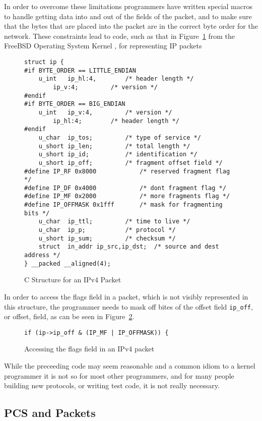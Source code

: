 \documentclass{sig-alternate-10pt}
\begin{document}
In order to overcome these limitations programmers have written
special macros to handle getting data into and out of the fields of
the packet, and to make sure that the bytes that are placed into the
packet are in the correct byte order for the network.  These
constraints lead to code, such as that in
Figure~\ref{fig:c-structure-for-an-ipv4-packet} from the FreeBSD
Operating System Kernel \cite{McKusick}, for representing IP packets

\begin{figure}
  \centering
\begin{verbatim}
struct ip {
#if BYTE_ORDER == LITTLE_ENDIAN
	u_int	ip_hl:4,		/* header length */
		ip_v:4;			/* version */
#endif
#if BYTE_ORDER == BIG_ENDIAN
	u_int	ip_v:4,			/* version */
		ip_hl:4;		/* header length */
#endif
	u_char	ip_tos;			/* type of service */
	u_short	ip_len;			/* total length */
	u_short	ip_id;			/* identification */
	u_short	ip_off;			/* fragment offset field */
#define	IP_RF 0x8000			/* reserved fragment flag */
#define	IP_DF 0x4000			/* dont fragment flag */
#define	IP_MF 0x2000			/* more fragments flag */
#define	IP_OFFMASK 0x1fff		/* mask for fragmenting bits */
	u_char	ip_ttl;			/* time to live */
	u_char	ip_p;			/* protocol */
	u_short	ip_sum;			/* checksum */
	struct	in_addr ip_src,ip_dst;	/* source and dest address */
} __packed __aligned(4);
\end{verbatim}
  \caption{C Structure for an IPv4 Packet}
  \label{fig:c-structure-for-an-ipv4-packet}
\end{figure}

In order to access the flags field in a packet, which is not visibly
represented in this structure, the programmer needs to mask off bites
of the offset field \verb|ip_off|, or offset, field, as can be seen in
Figure~\ref{fig:accessing-the-flags-field}.

\begin{figure}
  \centering
\begin{verbatim}
if (ip->ip_off & (IP_MF | IP_OFFMASK)) {  
\end{verbatim}
  \caption{Accessing the flags field in an IPv4 packet}
  \label{fig:accessing-the-flags-field}
\end{figure}

While the preceeding code may seem reasonable and a common idiom to a
kernel programmer it is not so for most other programmers, and for
many people building new protocols, or writing test code, it is not
really necessary.

\subsection{PCS and Packets}
\label{sec:pcs-and-packets}
\end{document}
